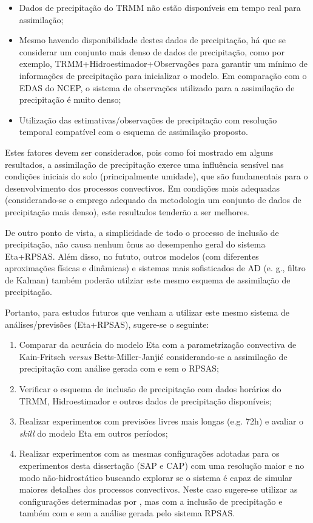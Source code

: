 \begin{itemize}
\item Dados de precipitação do TRMM não estão disponíveis em tempo real para assimilação;
\item Mesmo havendo disponibilidade destes dados de precipitação, há que se considerar um conjunto mais denso de dados de precipitação, como por exemplo, TRMM+Hidroestimador+Observações para garantir um mínimo de informações de precipitação para inicializar o modelo. Em comparação com o EDAS do NCEP, o sistema de observações utilizado para a assimilação de precipitação é muito denso;
\item Utilização das estimativas/observações de precipitação com resolução temporal compatível com o esquema de assimilação proposto.
\end{itemize}

Estes fatores devem ser considerados, pois como foi mostrado em alguns resultados, a assimilação de precipitação exerce uma influência sensível nas condições iniciais do solo (principalmente umidade), que são fundamentais para o desenvolvimento dos processos convectivos. Em condições mais adequadas (considerando-se o emprego adequado da metodologia um conjunto de dados de precipitação mais denso), este resultados tenderão a ser melhores.

De outro ponto de vista, a simplicidade de todo o processo de inclusão de precipitação, não causa nenhum ônus ao desempenho geral do sistema Eta+RPSAS. Além disso, no fututo, outros modelos (com diferentes aproximações físicas e dinâmicas) e sistemas mais sofisticados de AD (e. g., filtro de Kalman) também poderão utilziar este mesmo esquema de assimilação de precipitação.

Portanto, para estudos futuros que venham a utilizar este mesmo sistema de análises/previsões (Eta+RPSAS), sugere-se o seguinte:

\begin{enumerate}
\item Comparar da acurácia do modelo Eta com a parametrização convectiva de Kain-Fritsch \textit{versus} Betts-Miller-Janjić considerando-se a assimilação de precipitação com análise gerada com e sem o RPSAS;
\item Verificar o esquema de inclusão de precipitação com dados horários do TRMM, Hidroestimador e outros dados de precipitação disponíveis;
\item Realizar experimentos com previsões livres mais longas (e.g. 72h) e avaliar o \textit{skill} do modelo Eta em outros períodos;
\item Realizar experimentos com as mesmas configurações adotadas para os experimentos desta dissertação (SAP e CAP) com uma resolução maior e no modo não-hidrostático buscando explorar se o sistema é capaz de simular maiores detalhes dos processos convectivos. Neste caso sugere-se utilizar as configurações determinadas por , mas com a inclusão de precipitação e também com e sem a análise gerada pelo sistema RPSAS.
\end{enumerate}
